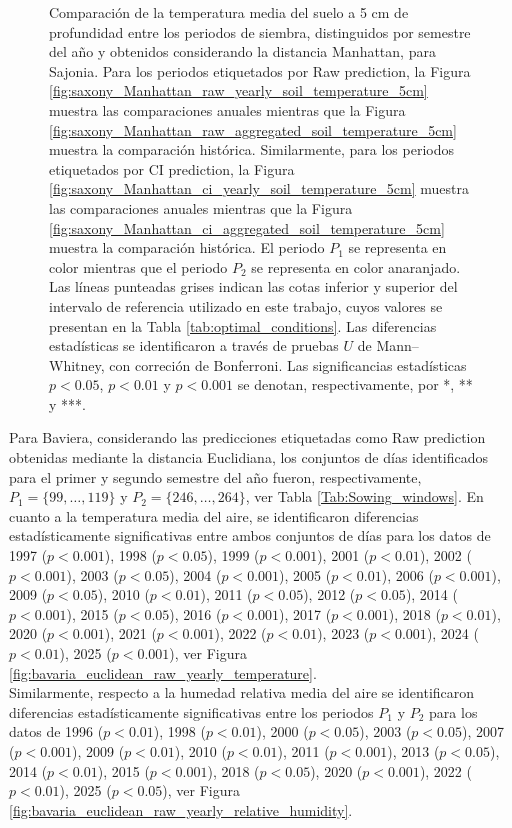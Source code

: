 \begin{figure}[htbp]
	\caption{
		Comparación de la temperatura media del suelo a 5 cm de profundidad entre los periodos de siembra, distinguidos por semestre del año y obtenidos considerando la distancia Manhattan, para Sajonia. Para los periodos etiquetados por Raw prediction, la Figura \ref{fig:saxony_Manhattan_raw_yearly_soil_temperature_5cm} muestra las comparaciones anuales mientras que la Figura \ref{fig:saxony_Manhattan_raw_aggregated_soil_temperature_5cm} muestra la comparación histórica. Similarmente, para los periodos etiquetados por CI prediction, la Figura \ref{fig:saxony_Manhattan_ci_yearly_soil_temperature_5cm} muestra las comparaciones anuales mientras que la Figura \ref{fig:saxony_Manhattan_ci_aggregated_soil_temperature_5cm} muestra la comparación histórica. El periodo $P_1$ se representa en color mientras que el periodo $P_2$ se representa en color anaranjado. Las líneas punteadas grises indican las cotas inferior y superior del intervalo de referencia utilizado en este trabajo, cuyos valores se presentan en la Tabla \ref{tab:optimal_conditions}. Las diferencias estadísticas se identificaron a través de pruebas $U$ de Mann--Whitney, con correción de Bonferroni. Las significancias estadísticas $p<0.05$, $p<0.01$ y $p<0.001$ se denotan, respectivamente, por *, ** y ***.
	}
	\label{fig:saxony_Manhattan_soil_temperature_5cm}
	
	
\end{figure}

\newpage

Para Baviera, considerando las predicciones etiquetadas como Raw prediction obtenidas mediante la distancia Euclidiana, los conjuntos de días identificados para el primer y segundo semestre del año fueron, respectivamente, $P_1=\{99,\ldots,119\}$ y $P_2=\{246,\ldots,264\}$, ver Tabla \ref{Tab:Sowing_windows}. En cuanto a la temperatura media del aire, se identificaron diferencias estadísticamente significativas entre ambos conjuntos de días para los datos de 1997	($p<0.001$), 1998	($p<0.05$), 1999	($p<0.001$), 2001	($p<0.01$), 2002	($p<0.001$), 2003	($p<0.05$), 2004	($p<0.001$), 2005	($p<0.01$), 2006	($p<0.001$), 2009	($p<0.05$), 2010	($p<0.01$), 2011	($p<0.05$), 2012	($p<0.05$), 2014	($p<0.001$), 2015	($p<0.05$), 2016	($p<0.001$), 2017	($p<0.001$), 2018	($p<0.01$), 2020	($p<0.001$), 2021	($p<0.001$), 2022	($p<0.01$), 2023	($p<0.001$), 2024	($p<0.01$), 2025	($p<0.001$), ver Figura \ref{fig:bavaria_euclidean_raw_yearly_temperature}.\\


Similarmente, respecto a la humedad relativa media del aire se identificaron diferencias estadísticamente significativas entre los periodos $P_1$ y $P_2$ para los datos de 1996	($p<0.01$), 1998	($p<0.01$), 2000	($p<0.05$), 2003	($p<0.05$), 2007	($p<0.001$), 2009	($p<0.01$), 2010	($p<0.01$), 2011	($p<0.001$), 2013	($p<0.05$), 2014	($p<0.01$), 2015	($p<0.001$), 2018	($p<0.05$), 2020	($p<0.001$), 2022	($p<0.01$), 2025	($p<0.05$), ver Figura \ref{fig:bavaria_euclidean_raw_yearly_relative_humidity}.\\

